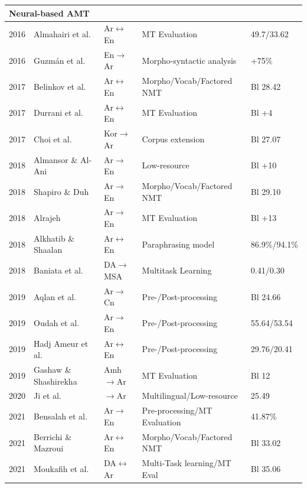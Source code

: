 \begin{small}
\begin{longtable}{|l|l|l|l|l|}
		\multicolumn{5}{l}{\textbf{Neural-based AMT}}\\
		\hline
		2016 & Almahairi et al. \cite{almahairi16}		& Ar$\leftrightarrow$En &MT Evaluation& 49.7/33.62\\
		2016 & Guzm{\'a}n et al. \cite{guzman16}		& En$\rightarrow$Ar &Morpho-syntactic analysis& +75\%\\
		2017 & Belinkov et al. \cite{belinkov17}		& Ar$\leftrightarrow$En &Morpho/Vocab/Factored NMT&Bl 28.42\\
		2017 & Durrani et al. \cite{durrani17}			& Ar$\leftrightarrow$En &MT Evaluation& Bl +4\\	
		2017 & Choi et al. \cite{choi17}				& Kor$\rightarrow$Ar &Corpus extension&Bl 27.07\\
		2018 & Almansor \& Al-Ani \cite{almansor18}		& Ar$\rightarrow$En &Low-resource& Bl +10\\
		2018 & Shapiro \& Duh \cite{shapiro18}			& Ar$\rightarrow$En &Morpho/Vocab/Factored NMT&Bl 29.10\\
		2018 & Alrajeh \cite{alrajeh18}					& Ar$\rightarrow$En &MT Evaluation& Bl +13\\
		2018 & Alkhatib \& Shaalan \cite{alkhatib18}	& Ar$\leftrightarrow$En &Paraphrasing model& 86.9\%/94.1\%\\
		2018 & Baniata et al. \cite{baniata18}			& DA$\rightarrow$MSA &Multitask Learning& 0.41/0.30\\
		2019 & Aqlan et al. \cite{aqlan19}				& Ar$\rightarrow$Cn &Pre-/Post-processing& Bl 24.66\\
		2019 & Oudah et al. \cite{oudah19}				& Ar$\rightarrow$En &Pre-/Post-processing& 55.64/53.54\\
		2019 & Hadj Ameur et al. \cite{hadjameur19}		& Ar$\leftrightarrow$En &Pre-/Post-processing&29.76/20.41\\	
		2019 & Gashaw \& Shashirekha \cite{gashaw19}	& Amh$\rightarrow$Ar &MT Evaluation& Bl 12\\	
		2020 & Ji et al. \cite{ji20}					& $\rightarrow$Ar &Multilingual/Low-resource& 25.49\\
		2021 & Bensalah et al. \cite{bensalah21}		&  Ar$\rightarrow$En &Pre-processing/MT Evaluation& 41.87\%\\
		2021 & Berrichi \& Mazroui \cite{berrichi21}	& Ar$\leftrightarrow$En & Morpho/Vocab/Factored NMT&Bl 33.02\\	
		2021 & Moukafih et al. \cite{moukafih21}		& DA$\leftrightarrow$Ar &Multi-Task learning/MT Eval&Bl 35.06\\	

\end{longtable}
\end{small}

